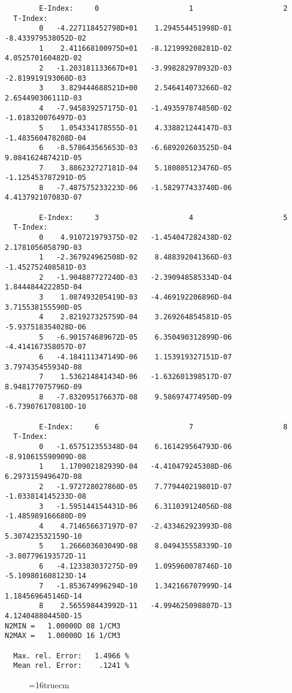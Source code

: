 \documentclass[12pt,dvipdfmx]{article}
\begin{document}
\begin{small}\begin{verbatim}
        E-Index:     0                     1                     2
  T-Index:
        0   -4.227118452798D+01    1.294554451998D-01   -8.433979538052D-02
        1    2.411668100975D+01   -8.121999208281D-02    4.052570160482D-02
        2   -1.203181133667D+01   -3.998282970932D-03   -2.819919193060D-03
        3    3.829444688521D+00    2.546414073266D-02    2.654490306111D-03
        4   -7.945839257175D-01   -1.493597874850D-02   -1.018320076497D-03
        5    1.054334178555D-01    4.338821244147D-03   -1.483560478208D-04
        6   -8.578643565653D-03   -6.689202603525D-04    9.084162487421D-05
        7    3.886232727181D-04    5.180805123476D-05   -1.125453787291D-05
        8   -7.487575233223D-06   -1.582977433740D-06    4.413792107083D-07

        E-Index:     3                     4                     5
  T-Index:
        0    4.910721979375D-02   -1.454047282438D-02    2.178105605879D-03
        1   -2.367924962508D-02    8.488392041366D-03   -1.452752408581D-03
        2   -1.904887727240D-03   -2.390948585334D-04    1.844484422285D-04
        3    1.087493205419D-03   -4.469192206896D-04    3.715538155590D-05
        4    2.821927325759D-04    3.269264854581D-05   -5.937518354028D-06
        5   -6.901574689672D-05    6.350490312899D-06   -4.414167358057D-07
        6   -4.184111347149D-06    1.153919327151D-07    3.797435455934D-08
        7    1.536214841434D-06   -1.632601398517D-07    8.948177075796D-09
        8   -7.832095176637D-08    9.586974774950D-09   -6.739076170810D-10

        E-Index:     6                     7                     8
  T-Index:
        0   -1.657512355348D-04    6.161429564793D-06   -8.910615590909D-08
        1    1.170902182939D-04   -4.410479245308D-06    6.297315949647D-08
        2   -1.972728027860D-05    7.779440219801D-07   -1.033814145233D-08
        3   -1.595144154431D-06    6.311039124056D-08   -1.485989166680D-09
        4    4.714656637197D-07   -2.433462923993D-08    5.307423532159D-10
        5    1.266603603049D-08    8.049435558339D-10   -3.807796193572D-11
        6   -4.123383037275D-09    1.095960078746D-10   -5.109801608123D-14
        7   -1.853674996294D-10    1.342166707999D-14    1.184569645146D-14
        8    2.565598443992D-11   -4.994625098807D-13    4.124048804450D-15
N2MIN =   1.00000D 08 1/CM3
N2MAX =   1.00000D 16 1/CM3

  Max. rel. Error:   1.4966 %
  Mean rel. Error:    .1241 %

\end{verbatim}\end{small}
\begin{figure} \label{2.3.9a}
\epsfxsize=16truecm
\end{figure}
\newpage
\end{document}
